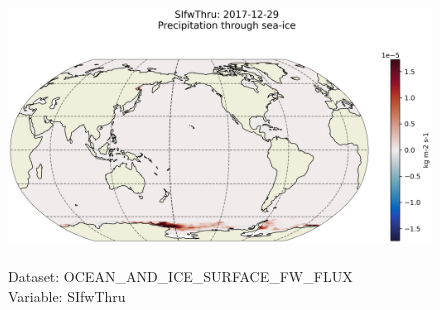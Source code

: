 \begin{figure}[H]
\centering
\includegraphics[scale=0.5]{../images/plots/latlon_plots/Ocean_and_Sea-Ice_Surface_Freshwater_Fluxes/SIfwThru.png}
\caption{\\Dataset: OCEAN\_AND\_ICE\_SURFACE\_FW\_FLUX\\Variable: SIfwThru}
\label{tab:table-OCEAN_AND_ICE_SURFACE_FW_FLUX_SIfwThru-Plot}
\end{figure}
\pagebreak
